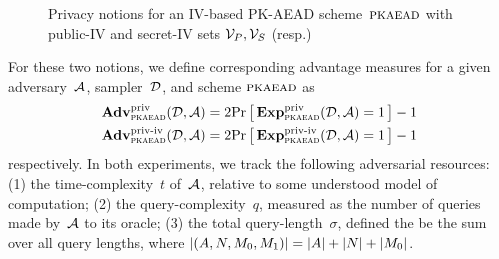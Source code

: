 \begin{figure}
\begin{center}
\caption{Privacy notions for an IV-based PK-AEAD scheme~$\textsc{pkaead}$ with public-IV and secret-IV sets $\mathcal{V}_P,\mathcal{V}_S$ (resp.)}
\label{fig:ind-cda}
\end{center}
\end{figure}

For these two notions, we define corresponding advantage measures for a given adversary~${\cal A}$, sampler~${\cal D}$, and scheme $\textsc{pkaead}$ as
\begin{align*}
\mathbf{Adv}^{\mathrm{priv}}_{\textsc{pkaead}}{({\cal D},{\cal A})}&=2{\Pr\left[\,{\mathbf{Exp}^{\mathrm{priv}}_{\textsc{pkaead}}{({\cal D},{\cal A})}=1}\,\right]}-1\\ \mathbf{Adv}^{\mathrm{priv\textnormal{-}iv}}_{\textsc{pkaead}}{({\cal D},{\cal A})}&=2{\Pr\left[\,{\mathbf{Exp}^{\mathrm{priv\textnormal{-}iv}}_{\textsc{pkaead}}{({\cal D},{\cal A})}=1}\,\right]}-1
\end{align*}
respectively.  In both experiments, we track the following adversarial resources: (1) the time-complexity~$t$ of~${\cal A}$, relative to some understood model of computation; (2) the query-complexity~$q$, measured as the number of queries made by~${\cal A}$ to its oracle; (3) the total query-length~$\sigma$, defined the be the sum over all query lengths, where $|(A,N,M_0,M_1)|=|A|+|N|+|M_0|$.


